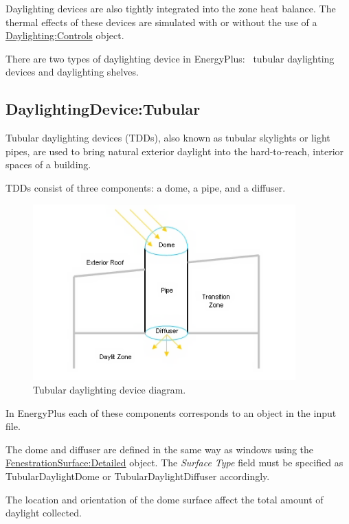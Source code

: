 Daylighting devices are also tightly integrated into the zone heat balance. The thermal effects of these devices are simulated with or without the use of a \hyperref[daylightingcontrols-000]{Daylighting:Controls} object.

There are two types of daylighting device in EnergyPlus:~ tubular daylighting devices and daylighting shelves.

\subsection{DaylightingDevice:Tubular}\label{daylightingdevicetubular}

Tubular daylighting devices (TDDs), also known as tubular skylights or light pipes, are used to bring natural exterior daylight into the hard-to-reach, interior spaces of a building.

TDDs consist of three components: a dome, a pipe, and a diffuser.

\begin{figure}[hbtp] %
\centering
\includegraphics[width=0.9\textwidth, height=0.9\textheight, keepaspectratio=true]{media/image108.png}
\caption{Tubular daylighting device diagram. \protect \label{fig:tubular-daylighting-device-diagram.}}
\end{figure}

In EnergyPlus each of these components corresponds to an object in the input file.

The dome and diffuser are defined in the same way as windows using the \hyperref[fenestrationsurfacedetailed]{FenestrationSurface:Detailed} object. The \emph{Surface Type} field must be specified as TubularDaylightDome or TubularDaylightDiffuser accordingly.

The location and orientation of the dome surface affect the total amount of daylight collected.

